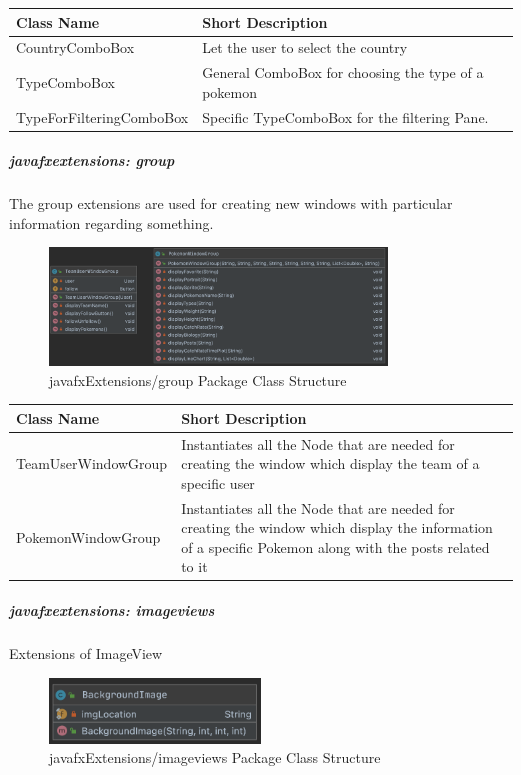 \begin{center}
	\begin{tabular}{| m{14em} | m{19em} |} 
		\hline
		\textbf{Class Name} & \textbf{Short Description} \\ [0.5ex] 
		\hline
		CountryComboBox & Let the user to select the country\\ 
		\hline
		TypeComboBox & General ComboBox for choosing the type of a pokemon\\ 
		\hline
		TypeForFilteringComboBox & Specific TypeComboBox for the filtering Pane.\\ 
		\hline
	\end{tabular}
\end{center}

\subparagraph{javafxextensions: group}
The group extensions are used for creating new windows with particular information regarding something. 
\begin{figure}[H]
	\centering
	\includegraphics[width=0.8\textwidth]{img/javafx_group_package.png}
	\caption{javafxExtensions/group Package Class Structure}
\end{figure}
\begin{center}
	\begin{tabular}{| m{14em} | m{19em} |} 
		\hline
		\textbf{Class Name} & \textbf{Short Description} \\ [0.5ex] 
		\hline
		TeamUserWindowGroup & Instantiates all the Node that are needed for creating the window which display the team of a specific user\\ 
		\hline
		PokemonWindowGroup & Instantiates all the Node that are needed for creating the window which display the information of a specific Pokemon along with the posts related to it\\ 
		\hline
	\end{tabular}
\end{center}
\subparagraph{javafxextensions: imageviews}
Extensions of ImageView
\begin{figure}[H]
	\centering
	\includegraphics[width=0.5\textwidth]{img/javafx_imageviews_package.png}
	\caption{javafxExtensions/imageviews Package Class Structure}
\end{figure}
